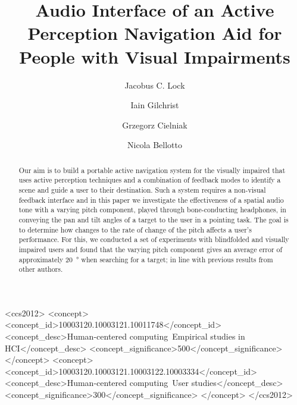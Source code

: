 \documentclass[sigconf, screen=true, anonymous=true]{acmart}
\begin{document}
\title{Audio Interface of an Active Perception Navigation Aid for People with Visual Impairments}

\author{Jacobus C. Lock}

\author{Iain Gilchrist}

\author{Grzegorz Cielniak}

\author{Nicola Bellotto}

\begin{abstract}
	Our aim is to build a portable active navigation system for the visually impaired that uses active perception techniques and a combination of feedback modes to identify a scene and guide a user to their destination.
	Such a system requires a non-visual feedback interface and in this paper we investigate the effectiveness of a spatial audio tone with a varying pitch component, played through bone-conducting headphones, in conveying the pan and tilt angles of a target to the user in a pointing task.
	The goal is to determine how changes to the rate of change of the pitch affects a user's performance.
	For this, we conducted a set of experiments with blindfolded and visually impaired users and found that the varying pitch component gives an average error of approximately \SI{20}{\degree} when searching for a target; in line with previous results from other authors.
\end{abstract}

 \begin{CCSXML}
<ccs2012>
<concept>
<concept_id>10003120.10003121.10011748</concept_id>
<concept_desc>Human-centered computing~Empirical studies in HCI</concept_desc>
<concept_significance>500</concept_significance>
</concept>
<concept>
<concept_id>10003120.10003121.10003122.10003334</concept_id>
<concept_desc>Human-centered computing~User studies</concept_desc>
<concept_significance>300</concept_significance>
</concept>
</ccs2012>
\end{CCSXML}
\end{document}
